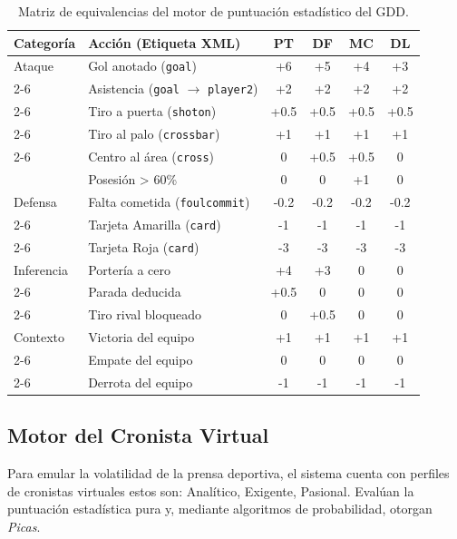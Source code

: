 \begin{table}[H]
    \centering
    \small
    \begin{tabular}{|p{2.2cm}|p{3.8cm}|c|c|c|c|}
        \hline
        \textbf{Categoría} & \textbf{Acción (Etiqueta XML)} & \textbf{PT} & \textbf{DF} & \textbf{MC} & \textbf{DL} \\
        \hline
        Ataque & Gol anotado (\texttt{goal}) & +6 & +5 & +4 & +3 \\ \cline{2-6}
               & Asistencia (\texttt{goal} $\rightarrow$ \texttt{player2}) & +2 & +2 & +2 & +2 \\ \cline{2-6}
               & Tiro a puerta (\texttt{shoton}) & +0.5 & +0.5 & +0.5 & +0.5 \\ \cline{2-6}
               & Tiro al palo (\texttt{crossbar}) & +1 & +1 & +1 & +1 \\ \cline{2-6}
               & Centro al área (\texttt{cross}) & 0 & +0.5 & +0.5 & 0 \\
               & Posesión > 60\% & 0 & 0 & +1 & 0 \\
        \hline
        Defensa & Falta cometida (\texttt{foulcommit}) & -0.2 & -0.2 & -0.2 & -0.2 \\ \cline{2-6}
                & Tarjeta Amarilla (\texttt{card}) & -1 & -1 & -1 & -1 \\ \cline{2-6}
                & Tarjeta Roja (\texttt{card}) & -3 & -3 & -3 & -3 \\
        \hline
        Inferencia & Portería a cero & +4 & +3 & 0 & 0 \\ \cline{2-6}
                   & Parada deducida & +0.5 & 0 & 0 & 0 \\ \cline{2-6}
                   & Tiro rival bloqueado & 0 & +0.5 & 0 & 0 \\
        \hline
        Contexto & Victoria del equipo & +1 & +1 & +1 & +1 \\ \cline{2-6}
                 & Empate del equipo & 0 & 0 & 0 & 0 \\ \cline{2-6}
                 & Derrota del equipo & -1 & -1 & -1 & -1 \\
        \hline
    \end{tabular}
    \caption{Matriz de equivalencias del motor de puntuación estadístico del GDD.}
    \label{tab:estadisticas_gdd}
\end{table}

\subsection{Motor del Cronista Virtual}
\label{app:gdd_cronistas}
Para emular la volatilidad de la prensa deportiva, el sistema cuenta con perfiles de cronistas virtuales estos son: Analítico, Exigente, Pasional. Evalúan la puntuación estadística pura y, mediante algoritmos de probabilidad, otorgan \textit{Picas}.

